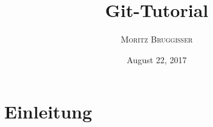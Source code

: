 \documentclass[twoside, 11pr]{article}
\title{\vspace{-10mm}\fontsize{15pt}{0pt}\selectfont\textbf{Git-Tutorial}} %
\author{
\textsc{Moritz Bruggisser}\\[-9mm] %
\vspace{-9mm}
}
\date{August 22, 2017}
\begin{document}
\maketitle %
\thispagestyle{fancy} %








%

\section{Einleitung}
\end{document}

